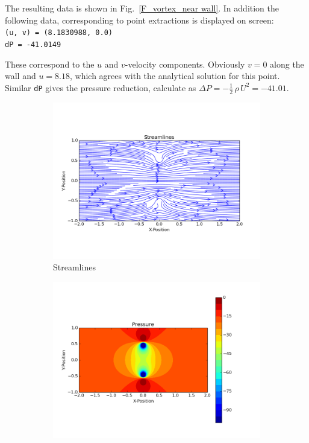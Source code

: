 \documentclass[10pt,a4paper]{article}
\begin{document}
The resulting data is shown in Fig.~\ref{F_vortex_near wall}. 
In addition the following data, corresponding to point extractions is displayed on screen: \\
\verb'(u, v) = (8.1830988, 0.0)' \\
\verb'dP = -41.0149'

These correspond to the $u$ and $v$-velocity components. 
Obviously $v=0$ along the wall and $u=8.18$, which agrees with the analytical solution for this point.  
Similar \verb'dP' gives the pressure reduction, calculate as $\Delta P = - \frac{1}{2} \, \rho \, U^2 = -41.01$. 


\begin{figure}
\centering
\begin{subfigure}{0.48\textwidth}
    \includegraphics[width=1.0\textwidth]{Figures/Vortex_wall_SL}
  \caption{Streamlines}
\end{subfigure}
\hfill
\begin{subfigure}{0.48\textwidth}
    \includegraphics[width=1.0\textwidth]{Figures/Vortex_wall_Pressure}

\end{subfigure}
\end{figure}
\end{document}
